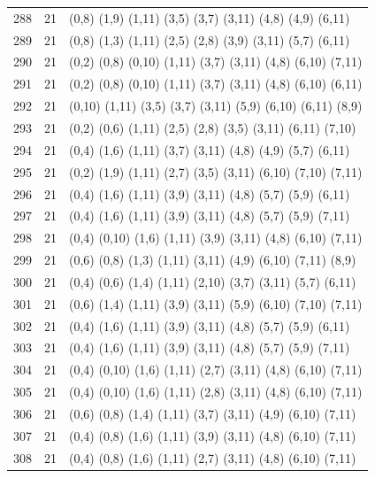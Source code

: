 \begin{appendix}
{\begin{longtable}{lll}
    288& 21 & (0,8)   (1,9)   (1,11)  (3,5)   (3,7)   (3,11)  (4,8)   (4,9)   (6,11)\\
    289& 21 & (0,8)   (1,3)   (1,11)  (2,5)   (2,8)   (3,9)   (3,11)  (5,7)   (6,11)\\
    290& 21 & (0,2)   (0,8)   (0,10)  (1,11)  (3,7)   (3,11)  (4,8)   (6,10)  (7,11)\\
    291& 21 & (0,2)   (0,8)   (0,10)  (1,11)  (3,7)   (3,11)  (4,8)   (6,10)  (6,11)\\
    292& 21 & (0,10)  (1,11)  (3,5)   (3,7)   (3,11)  (5,9)   (6,10)  (6,11)  (8,9)\\
    293& 21 & (0,2)   (0,6)   (1,11)  (2,5)   (2,8)   (3,5)   (3,11)  (6,11)  (7,10)\\
    294& 21 & (0,4)   (1,6)   (1,11)  (3,7)   (3,11)  (4,8)   (4,9)   (5,7)   (6,11)\\
    295& 21 & (0,2)   (1,9)   (1,11)  (2,7)   (3,5)   (3,11)  (6,10)  (7,10)  (7,11)\\
    296& 21 & (0,4)   (1,6)   (1,11)  (3,9)   (3,11)  (4,8)   (5,7)   (5,9)   (6,11)\\
    297& 21 & (0,4)   (1,6)   (1,11)  (3,9)   (3,11)  (4,8)   (5,7)   (5,9)   (7,11)\\
    298& 21 & (0,4)   (0,10)  (1,6)   (1,11)  (3,9)   (3,11)  (4,8)   (6,10)  (7,11)\\
    299& 21 & (0,6)   (0,8)   (1,3)   (1,11)  (3,11)  (4,9)   (6,10)  (7,11)  (8,9)\\
    300& 21 & (0,4)   (0,6)   (1,4)   (1,11)  (2,10)  (3,7)   (3,11)  (5,7)   (6,11)\\
    301& 21 & (0,6)   (1,4)   (1,11)  (3,9)   (3,11)  (5,9)   (6,10)  (7,10)  (7,11)\\
    302& 21 & (0,4)   (1,6)   (1,11)  (3,9)   (3,11)  (4,8)   (5,7)   (5,9)   (6,11)\\
    303& 21 & (0,4)   (1,6)   (1,11)  (3,9)   (3,11)  (4,8)   (5,7)   (5,9)   (7,11)\\
    304& 21 & (0,4)   (0,10)  (1,6)   (1,11)  (2,7)   (3,11)  (4,8)   (6,10)  (7,11)\\
    305& 21 & (0,4)   (0,10)  (1,6)   (1,11)  (2,8)   (3,11)  (4,8)   (6,10)  (7,11)\\
    306& 21 & (0,6)   (0,8)   (1,4)   (1,11)  (3,7)   (3,11)  (4,9)   (6,10)  (7,11)\\
    307& 21 & (0,4)   (0,8)   (1,6)   (1,11)  (3,9)   (3,11)  (4,8)   (6,10)  (7,11)\\
    308& 21 & (0,4)   (0,8)   (1,6)   (1,11)  (2,7)   (3,11)  (4,8)   (6,10)  (7,11)\\

\end{longtable}}
\end{appendix}
